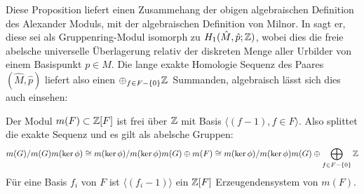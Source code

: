 	Diese Proposition liefert einen Zusammehang der obigen algebraischen Definition des Alexander Moduls, mit der algebraischen Definition von Milnor. In \cite{McMullen2002} sagt er, diese sei als Gruppenring-Modul isomorph zu $H_1(\hat M,\hat p;\mathbb{Z})$, wobei dies die freie abelsche universelle Überlagerung relativ der diskreten Menge aller Urbilder von einem Basispunkt $p \in M$. Die lange exakte Homologie Sequenz des Paares $(\hat M,\hat p)$ liefert also einen $\oplus_{f \in F - \{0\}}\mathbb{Z}$~Summanden, algebraisch lässt sich dies auch einsehen:
	\begin{prop}
	 	Der Modul $m(F)\subset \mathbb{Z}[F]$ ist frei über $\mathbb{Z}$ mit Basis $\langle (f-1),f\in F \rangle$. Also splittet die exakte Sequenz und es gilt als abelsche Gruppen:
	 	\[
	 		m(G)/m(G)m(\ker\phi) \cong m(\ker\phi)/m(\ker\phi)m(G) \oplus m(F) \cong  m(\ker\phi)/m(\ker\phi)m(G) \oplus \bigoplus_{f\in F-\{0\}} \mathbb{Z}
	 	\]
	 	 Für eine Basis $f_i$ von $F$ ist $\langle(f_i-1)\rangle$ ein $\mathbb{Z}[F]$ Erzeugendensystem von $m(F)$.
	 \end{prop} 
